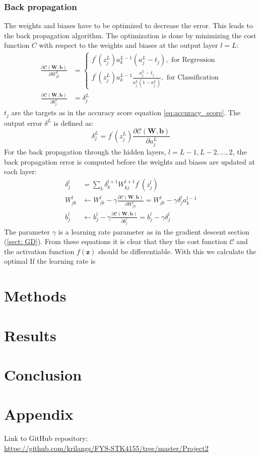 \documentclass[12pt,a4paper,english]{article}
\begin{document}
\subsubsection{Back propagation}
\label{subsect:back_prop}
The weights and biases have to be optimized to decrease the error. This leads to the back propagation algorithm. The optimization is done by minimizing the cost function $C$ with respect to the weights and biases at the output layer $l=L$:
\begin{align*}
\frac{\partial \mathcal{C}(\textbf{W},\textbf{b})}{\partial W^L_{jk}}&=\begin{cases*}
f^{\prime}(z^L_j)a_k^{L-1}(a^L_j-t_j), \text{ for Regression}\\
f^{\prime}(z^L_j)a_k^{L-1}\frac{a^L_j-t_j}{a^L_j(1-a^L_j)}, \text{ for Classification}
\end{cases*}\\
\frac{\partial \mathcal{C}(\textbf{W},\textbf{b})}{\partial b^L_{j}}&=\delta_j^L
\end{align*}
$t_j$ are the targets as in the accuracy score equation \ref{eq:accuracy_score}. The output error $\delta^L$ is defined as:
\begin{equation*}
\delta_j^L=f^{\prime}(z^L_j)\frac{\partial \mathcal{C}(\textbf{W},\textbf{b})}{\partial a^L_j}
\end{equation*}
For the back propagation through the hidden layers, $l=L-1,L-2,...,2$, the back propagation error is computed before the weights and biases are updated at each layer:
\begin{align*}
\delta_j^l&=\sum_{k}\delta_k^{l+1}W_{kj}^{l+1}f^{\prime}(z^l_j)\\
W_{jk}^l&\leftarrow W_{jk}^l-\gamma\frac{\partial \mathcal{C}(\textbf{W},\textbf{b})}{\partial W_{jk}^l}= W_{jk}^l -\gamma \delta_j^la_k^{l-1} \\
b^l_j&\leftarrow b^l_j-\gamma\frac{\partial \mathcal{C}(\textbf{W},\textbf{b})}{\partial b_j^l}=b^l_j-\gamma\delta_j^l
\end{align*}
The parameter $\gamma$ is a learning rate parameter as in the gradient descent section (\ref{sect: GD}). From these equations it is clear that they the cost function $\mathcal{C}$ and the activation function $f(\textbf{z})$ should be differentiable. With this we calculate the optimal If the learning rate is 

\section{Methods}
\section{Results}
\section{Conclusion}
\appendix
\section{Appendix}
\label{sect:Appendix}
Link to GitHub repository:\\
\url{https://github.com/krilangs/FYS-STK4155/tree/master/Project2}



\end{document}
